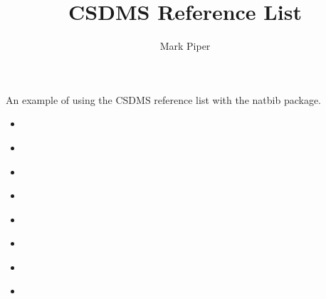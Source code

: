 \documentclass[11pt]{article}
\begin{document}
\title{CSDMS Reference List}
\author{Mark Piper}
\maketitle

An example of using the CSDMS reference list
with the natbib package.

\begin{itemize}
\item \cite{tucker:2010}
\item \cite{overeem:2015a}
\item \citet{kettner:2008}\
\item \citep{hutton:2008}
\item \cite{piper:2015}
\item \cite{blanca:2017}
\item \citet{jupyter:2015}
\item \citep{gdal:2017}
\end{itemize}


\end{document}

